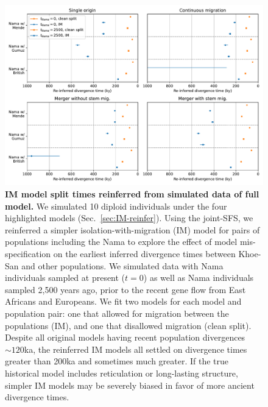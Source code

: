 \documentclass[]{article}
\begin{document}
\begin{figure}[ht]
    \centering
    \includegraphics[width=\textwidth]{figures/supp-IM-misspecification}
    \caption{
        \textbf{IM model split times reinferred from simulated data of full
        model.} We simulated 10 diploid individuals under the four highlighted
        models (Sec.~\ref{sec:IM-reinfer}). Using the joint-SFS, we reinferred
        a simpler isolation-with-migration (IM) model for pairs of populations
        including the Nama to explore the effect of model mis-specification on
        the earliest inferred divergence times between Khoe-San and other
        populations. We simulated data with Nama individuals sampled at present
        ($t=0$) as well as Nama individuals sampled 2,500 years ago, prior to
        the recent gene flow from East Africans and Europeans. We fit two
        models for each model and population pair: one that allowed for
        migration between the populations (IM), and one that disallowed
        migration (clean split). Despite all original models having recent
        population divergences $\sim120$ka, the reinferred IM models all
        settled on divergence times greater than 200ka and sometimes much
        greater. If the true historical model includes reticulation or
        long-lasting structure, simpler IM models may be severely biased in
        favor of more ancient divergence times.
    }
    \label{fig:supp-IM-misspecification}
\end{figure}
\end{document}
